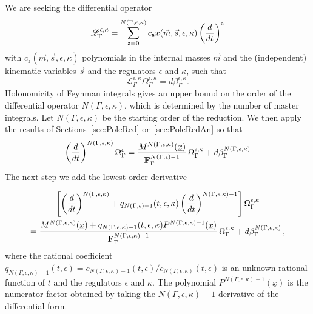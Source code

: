 \documentclass[a4paper,12pt]{article}
\numberwithin{equation}{section}
\numberwithin{figure}{section}
\begin{document}
We are seeking the differential operator 
\begin{equation}\label{e:PFgeneric}
  \mathscr{L}_\Gamma^{\epsilon,\kappa}=\sum_{\mathsf{a}=0}^{N(\Gamma,\epsilon,\kappa)}
  c_{\mathsf{a}}x(\vec m,\vec s,\epsilon,\kappa) \left(d\over dt\right)^{\mathsf{a}}
\end{equation}
with $c_{\mathsf{a}}(\vec m,\vec s,\epsilon,\kappa)$ polynomials in the internal masses
$\vec m$  and the (independent) kinematic variables $\vec s$  and the
regulators $\epsilon$  and $\kappa$, such that
\begin{equation}
     \mathscr{L}_\Gamma^{\epsilon,\kappa} \Omega_\Gamma^{\epsilon,\kappa}= d\beta^{\epsilon,\kappa}_\Gamma.
   \end{equation}
%
Holonomicity of Feynman integrals gives an upper bound on the order of the differential operator $N(\Gamma,\epsilon,\kappa)$, which is  determined by
 the number of master
integrals. Let $N(\Gamma,\epsilon,\kappa)$  be the starting order of the
reduction.  We then apply the results of Sections~\ref{sec:PoleRed}
or~\ref{sec:PoleRedAn} so that
%
\begin{equation}\label{e:step1}
\left(d\over dt\right)^{N(\Gamma,\epsilon,\kappa)} \Omega_\Gamma^\epsilon= {M^{
      N(\Gamma,\epsilon,\kappa)}(\underline x)\over
    \textbf{F}_\Gamma^{N(\Gamma,\epsilon)-1}
  } \,\Omega_\Gamma^{\epsilon,\kappa}+ d\beta_\Gamma^{N(\Gamma,\epsilon,\kappa)}  
\end{equation}
%
The next step we add the lowest-order derivative

\begin{multline}\label{e:step2}
\left[\left(d\over dt\right)^{N(\Gamma,\epsilon,\kappa)}
  +q_{N(\Gamma,\epsilon)-1}(t,\epsilon,\kappa) \left(d\over dt\right)^{N(\Gamma,\epsilon,\kappa)-1}\right] \Omega_\Gamma^{\epsilon,\kappa}\cr= {M^{
      N(\Gamma,\epsilon,\kappa)}(\underline x)+q_{N(\Gamma,\epsilon,\kappa)-1}(t,\epsilon,\kappa)
    P^{N(\Gamma,\epsilon,\kappa)-1}(\underline x) \over
    \textbf{F}_\Gamma^{N(\Gamma,\epsilon,\kappa)-1}
  }\,\Omega_\Gamma^{\epsilon,\kappa}+ d\beta_\Gamma^{N(\Gamma,\epsilon,\kappa)}\, ,  
\end{multline}
where the rational coefficient
$q_{N(\Gamma,\epsilon,\kappa)-1}(t,\epsilon)=c_{N(\Gamma,\epsilon,\kappa)-1}(t,\epsilon)/c_{N(\Gamma,\epsilon,\kappa)}(t,\epsilon)$
is an unknown rational function of $t$ and  the regulators $\epsilon$
and $\kappa$. 
The polynomial $ P^{N(\Gamma,\epsilon,\kappa)-1}(\underline x) $
is the numerator factor obtained by taking the $N(\Gamma,\epsilon,\kappa)-1$
derivative of the differential form.
\end{document}
